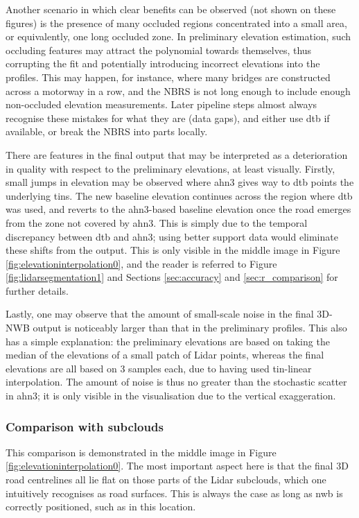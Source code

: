 Another scenario in which clear benefits can be observed (not shown on these figures) is the presence of many occluded regions concentrated into a small area, or equivalently, one long occluded zone. In preliminary elevation estimation, such occluding features may attract the polynomial towards themselves, thus corrupting the fit and potentially introducing incorrect elevations into the profiles. This may happen, for instance, where many bridges are constructed across a motorway in a row, and the NBRS is not long enough to include enough non-occluded elevation measurements. Later pipeline steps almost always recognise these mistakes for what they are (data gaps), and either use \ac{dtb} if available, or break the NBRS into parts locally.

There are features in the final output that may be interpreted as a deterioration in quality with respect to the preliminary elevations, at least visually. Firstly, small jumps in elevation may be observed where \ac{ahn3} gives way to \ac{dtb} points the underlying \ac{tin}s. The new baseline elevation continues across the region where \ac{dtb} was used, and reverts to the \ac{ahn3}-based baseline elevation once the road emerges from the zone not covered by \ac{ahn3}. This is simply due to the temporal discrepancy between \ac{dtb} and \ac{ahn3}; using better support data would eliminate these shifts from the output. This is only visible in the middle image in Figure \ref{fig:elevationinterpolation0}, and the reader is referred to Figure \ref{fig:lidarsegmentation1} and Sections \ref{sec:accuracy} and \ref{sec:r_comparison} for further details.

Lastly, one may observe that the amount of small-scale noise in the final 3D-NWB output is noticeably larger than that in the preliminary profiles. This also has a simple explanation: the preliminary elevations are based on taking the median of the elevations of a small patch of Lidar points, whereas the final elevations are all based on 3 samples each, due to having used \ac{tin}-linear interpolation. The amount of noise is thus no greater than the stochastic scatter in \ac{ahn3}; it is only visible in the visualisation due to the vertical exaggeration.

\subsubsection{Comparison with subclouds}

This comparison is demonstrated in the middle image in Figure \ref{fig:elevationinterpolation0}. The most important aspect here is that the final 3D road centrelines all lie flat on those parts of the Lidar subclouds, which one intuitively recognises as road surfaces. This is always the case as long as \ac{nwb} is correctly positioned, such as in this location.

